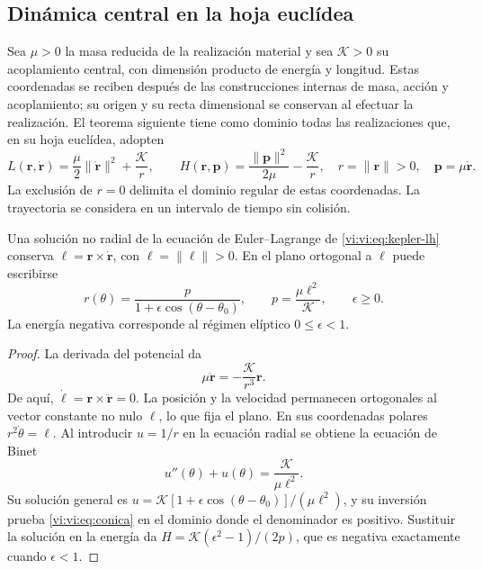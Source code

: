 \subsection{Dinámica central en la hoja euclídea}
\label{vi:vi:subsec:dinamica-central}

Sea $\mu>0$ la masa reducida de la realización material y sea
$\mathcal K>0$ su acoplamiento central, con dimensión
producto de energía y longitud. Estas coordenadas se reciben después
de las construcciones internas de masa, acción y acoplamiento;
su origen y su recta dimensional se conservan al efectuar la
realización. El teorema siguiente tiene como dominio todas
las realizaciones que, en su hoja euclídea, adopten
\begin{equation}
 L(\mathbf r,\dot{\mathbf r})
 =\frac\mu2\|\dot{\mathbf r}\|^2+\frac{\mathcal K}{r},
 \qquad
 H(\mathbf r,\mathbf p)
 =\frac{\|\mathbf p\|^2}{2\mu}-\frac{\mathcal K}{r},
 \quad r=\|\mathbf r\|>0,
 \quad\mathbf p=\mu\dot{\mathbf r}.
 \label{vi:vi:eq:kepler-lh}
\end{equation}
La exclusión de $r=0$ delimita el dominio regular de estas
coordenadas. La trayectoria se considera en un intervalo de
tiempo sin colisión.

\begin{proposition}
\label{vi:vi:prop:conica}
Una solución no radial de la ecuación de Euler--Lagrange de
\eqref{vi:vi:eq:kepler-lh} conserva
$\boldsymbol\ell=\mathbf r\times\dot{\mathbf r}$, con
$\ell=\|\boldsymbol\ell\|>0$. En el plano ortogonal a
$\boldsymbol\ell$ puede escribirse
\begin{equation}
 r(\theta)=\frac{p}{1+\epsilon\cos(\theta-\theta_0)},
 \qquad p=\frac{\mu\ell^2}{\mathcal K},
 \qquad \epsilon\geq0.
 \label{vi:vi:eq:conica}
\end{equation}
La energía negativa corresponde al régimen elíptico
$0\leq\epsilon<1$.
\end{proposition}
\begin{proof}
La derivada del potencial da
\begin{equation}
 \mu\ddot{\mathbf r}=-\frac{\mathcal K}{r^3}\mathbf r.
 \label{vi:vi:eq:fuerza-central}
\end{equation}
De aquí,
$\dot{\boldsymbol\ell}=\mathbf r\times\ddot{\mathbf r}=0$.
La posición y la velocidad permanecen ortogonales al vector
constante no nulo $\boldsymbol\ell$, lo que fija el plano.
En sus coordenadas polares $r^2\dot\theta=\ell$. Al introducir
$u=1/r$ en la ecuación radial se obtiene la ecuación de Binet
\[
 u''(\theta)+u(\theta)=\frac{\mathcal K}{\mu\ell^2}.
\]
Su solución general es
$u=\mathcal K[1+\epsilon\cos(\theta-\theta_0)]/(\mu\ell^2)$,
y su inversión prueba \eqref{vi:vi:eq:conica} en el dominio
donde el denominador es positivo. Sustituir la solución en
la energía da
$H=\mathcal K(\epsilon^2-1)/(2p)$, que es negativa
exactamente cuando $\epsilon<1$.
\end{proof}

